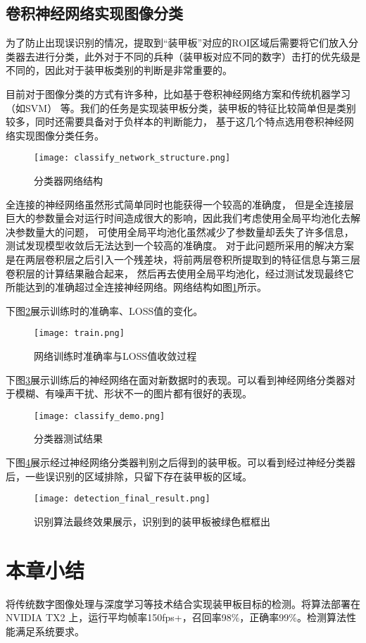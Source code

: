 \subsection{卷积神经网络实现图像分类}

为了防止出现误识别的情况，提取到“装甲板”对应的ROI区域后需要将它们放入分类器去进行分类，此外对于不同的兵种（装甲板对应不同的数字）击打的优先级是不同的，因此对于装甲板类别的判断是非常重要的。\par
目前对于图像分类的方式有许多种，比如基于卷积神经网络\cite{krizhevsky2017imagenet}方案和传统机器学习（如SVM\cite{cortes1995support}）
等。我们的任务是实现装甲板分类，装甲板的特征比较简单但是类别较多，同时还需要具备对于负样本的判断能力，
基于这几个特点选用卷积神经网络实现图像分类任务。
\begin{figure}[H]
    \centering
    \texttt{[image: classify\_network\_structure.png]} 
    \caption{分类器网络结构} 
    \label{分类器网络结构}
\end{figure}
全连接的神经网络虽然形式简单同时也能获得一个较高的准确度，
但是全连接层巨大的参数量会对运行时间造成很大的影响，因此我们考虑使用全局平均池化去解决参数量大的问题，
可使用全局平均池化虽然减少了参数量却丢失了许多信息，测试发现模型收敛后无法达到一个较高的准确度。
对于此问题所采用的解决方案是在两层卷积层之后引入一个残差块\cite{he2016deep}，将前两层卷积所提取到的特征信息与第三层卷积层的计算结果融合起来，
然后再去使用全局平均池化，经过测试发现最终它所能达到的准确超过全连接神经网络。网络结构如图\ref{分类器网络结构}所示。


下图\ref{网络训练时准确率与LOSS值收敛过程}展示训练时的准确率、LOSS值的变化。
\begin{figure}[H]
    \centering
    \texttt{[image: train.png]} 
    \caption{网络训练时准确率与LOSS值收敛过程} 
    \label{网络训练时准确率与LOSS值收敛过程}
\end{figure}


下图\ref{分类器测试结果}展示训练后的神经网络在面对新数据时的表现。可以看到神经网络分类器对于模糊、有噪声干扰、形状不一的图片都有很好的表现。
\begin{figure}[H]
    \centering
    \texttt{[image: classify\_demo.png]} 
    \caption{分类器测试结果} 
    \label{分类器测试结果}
\end{figure}

下图\ref{识别算法最终效果展示}展示经过神经网络分类器判别之后得到的装甲板。可以看到经过神经分类器后，一些误识别的区域排除，只留下存在装甲板的区域。
\begin{figure}[H]
    \centering
    \texttt{[image: detection\_final\_result.png]} 
    \caption{识别算法最终效果展示，识别到的装甲板被绿色框框出} 
    \label{识别算法最终效果展示}
\end{figure}

\section{本章小结}
将传统数字图像处理与深度学习等技术结合实现装甲板目标的检测。将算法部署在NVIDIA TX2 上，运行平均帧率150fps+，召回率98\%，正确率99\%。检测算法性能满足系统要求。



